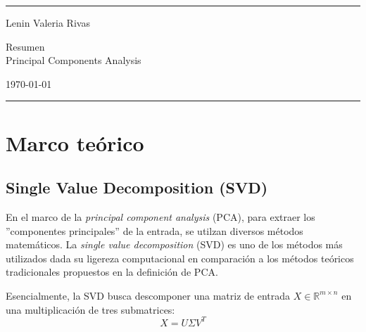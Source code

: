 \documentclass[a4paper]{article}
\begin{document}

\fancyhead[C]{}
\hrule \medskip %
\begin{minipage}{0.295\textwidth} 
\raggedright
\footnotesize
Lenin Valeria Rivas\hfill\\

\end{minipage}
\begin{minipage}{0.4\textwidth} 
\centering 
\large 
Resumen\\ 
\normalsize 
Principal Components Analysis\\ 
\end{minipage}
\begin{minipage}{0.295\textwidth} 
\raggedleft
\today\hfill\\
\end{minipage}
\medskip\hrule 
\bigskip


\section{Marco teórico}

\subsection{Single Value Decomposition (SVD)}

En el marco de la \textit{principal component analysis} (PCA), para extraer los ''componentes principales'' de 
la entrada, se utilzan diversos métodos matemáticos. La \textit{single value decomposition} (SVD) es uno de los métodos más
utilizados dada su ligereza computacional en comparación a los métodos teóricos tradicionales propuestos en la definición de PCA.

Esencialmente, la SVD busca descomponer una matriz de entrada $X \in \mathbb{R}^{m\times n}$ en una multiplicación de tres submatrices:
\begin{equation}
    X = U \Sigma V^T
\end{equation}
\end{document}
